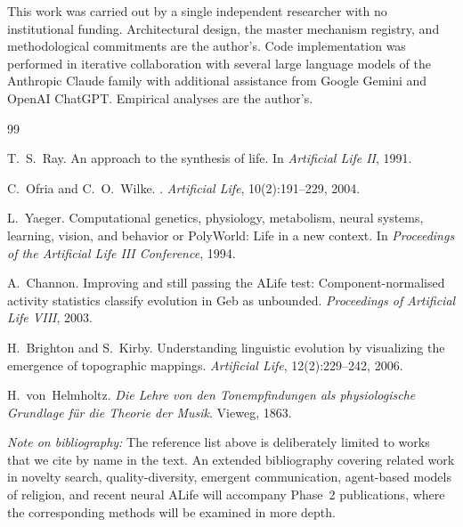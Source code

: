 \documentclass[11pt,a4paper]{article}
\begin{document}
This work was carried out by a single independent researcher with no
institutional funding. Architectural design, the master mechanism
registry, and methodological commitments are the author's. Code
implementation was performed in iterative collaboration with several
large language models of the Anthropic Claude family with additional assistance from Google Gemini and OpenAI ChatGPT. Empirical analyses are the author's.

\begin{thebibliography}{99}

T.~S.~Ray.
\newblock An approach to the synthesis of life.
\newblock In \emph{Artificial Life II}, 1991.

C.~Ofria and C.~O.~Wilke.
.
\newblock \emph{Artificial Life}, 10(2):191--229, 2004.

L.~Yaeger.
\newblock Computational genetics, physiology, metabolism, neural systems,
         learning, vision, and behavior or PolyWorld: Life in a new context.
\newblock In \emph{Proceedings of the Artificial Life III Conference}, 1994.

A.~Channon.
\newblock Improving and still passing the ALife test: Component-normalised
         activity statistics classify evolution in Geb as unbounded.
\newblock \emph{Proceedings of Artificial Life VIII}, 2003.

H.~Brighton and S.~Kirby.
\newblock Understanding linguistic evolution by visualizing the emergence
         of topographic mappings.
\newblock \emph{Artificial Life}, 12(2):229--242, 2006.

H.~von~Helmholtz.
\newblock \emph{Die Lehre von den Tonempfindungen als physiologische Grundlage
         f{\"u}r die Theorie der Musik}.
\newblock Vieweg, 1863.

\end{thebibliography}

\noindent\textit{Note on bibliography:} The reference list above is
deliberately limited to works that we cite by name in the text. An
extended bibliography covering related work in novelty search,
quality-diversity, emergent communication, agent-based models of
religion, and recent neural ALife will accompany Phase~2 publications,
where the corresponding methods will be examined in more depth.
\end{document}

